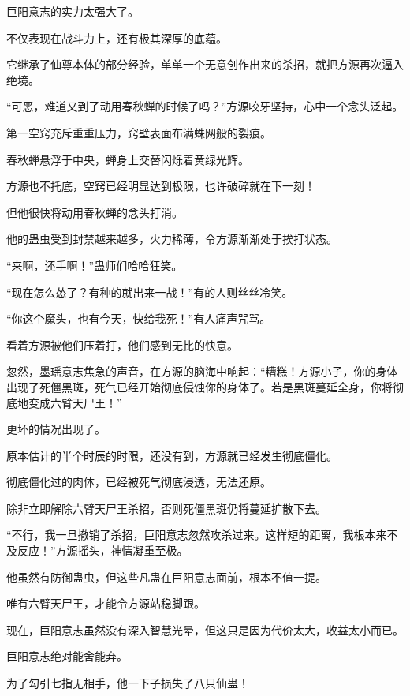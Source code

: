 
\begin{this_body}

巨阳意志的实力太强大了。

不仅表现在战斗力上，还有极其深厚的底蕴。

它继承了仙尊本体的部分经验，单单一个无意创作出来的杀招，就把方源再次逼入绝境。

“可恶，难道又到了动用春秋蝉的时候了吗？”方源咬牙坚持，心中一个念头泛起。

第一空窍充斥重重压力，窍壁表面布满蛛网般的裂痕。

春秋蝉悬浮于中央，蝉身上交替闪烁着黄绿光辉。

方源也不托底，空窍已经明显达到极限，也许破碎就在下一刻！

但他很快将动用春秋蝉的念头打消。

他的蛊虫受到封禁越来越多，火力稀薄，令方源渐渐处于挨打状态。

“来啊，还手啊！”蛊师们哈哈狂笑。

“现在怎么怂了？有种的就出来一战！”有的人则丝丝冷笑。

“你这个魔头，也有今天，快给我死！”有人痛声咒骂。

看着方源被他们压着打，他们感到无比的快意。

忽然，墨瑶意志焦急的声音，在方源的脑海中响起：“糟糕！方源小子，你的身体出现了死僵黑斑，死气已经开始彻底侵蚀你的身体了。若是黑斑蔓延全身，你将彻底地变成六臂天尸王！”

更坏的情况出现了。

原本估计的半个时辰的时限，还没有到，方源就已经发生彻底僵化。

彻底僵化过的肉体，已经被死气彻底浸透，无法还原。

除非立即解除六臂天尸王杀招，否则死僵黑斑仍将蔓延扩散下去。

“不行，我一旦撤销了杀招，巨阳意志忽然攻杀过来。这样短的距离，我根本来不及反应！”方源摇头，神情凝重至极。

他虽然有防御蛊虫，但这些凡蛊在巨阳意志面前，根本不值一提。

唯有六臂天尸王，才能令方源站稳脚跟。

现在，巨阳意志虽然没有深入智慧光晕，但这只是因为代价太大，收益太小而已。

巨阳意志绝对能舍能弃。

为了勾引七指无相手，他一下子损失了八只仙蛊！


\end{this_body}
